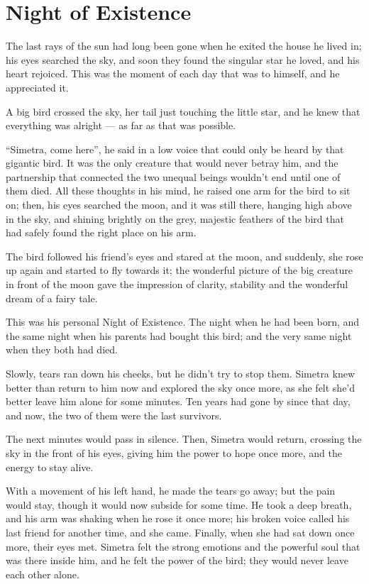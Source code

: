 \chapter{Night of Existence}
\label{cha:night-existence}
The last rays of the sun had long been gone when he exited the house he lived in; his eyes searched the sky, and soon they found the singular star he loved, and his heart rejoiced. This was the moment of each day that was to himself, and he appreciated it.

A big bird crossed the sky, her tail just touching the little star, and he knew that everything was alright --- as far as that was possible.

\enquote{Simetra, come here}, he said in a low voice that could only be heard by that gigantic bird. It was the only creature that would never betray him, and the partnership that connected the two unequal beings wouldn't end until one of them died. All these thoughts in his mind, he raised one arm for the bird to sit on; then, his eyes searched the moon, and it was still there, hanging high above in the sky, and shining brightly on the grey, majestic feathers of the bird that had safely found the right place on his arm.

The bird followed his friend's eyes and stared at the moon, and suddenly, she rose up again and started to fly towards it; the wonderful picture of the big creature in front of the moon gave the impression of clarity, stability and the wonderful dream of a fairy tale.

This was his personal Night of Existence. The night when he had been born, and the same night when his parents had bought this bird; and the very same night when they both had died.

Slowly, tears ran down his cheeks, but he didn't try to stop them. Simetra knew better than return to him now and explored the sky once more, as she felt she'd better leave him alone for some minutes. Ten years had gone by since that day, and now, the two of them were the last survivors.

The next minutes would pass in silence. Then, Simetra would return, crossing the sky in the front of his eyes, giving him the power to hope once more, and the energy to stay alive.

With a movement of his left hand, he made the tears go away; but the pain would stay, though it would now subside for some time. He took a deep breath, and his arm was shaking when he rose it once more; his broken voice called his last friend for another time, and she came. Finally, when she had sat down once more, their eyes met. Simetra felt the strong emotions and the powerful soul that was there inside him, and he felt the power of the bird; they would never leave each other alone.

